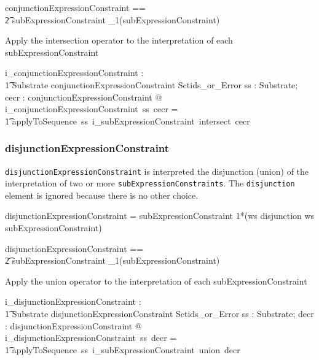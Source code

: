 \documentclass{article}
\def\spec#1{{\tt #1}}
\def\bnf#1{{\scriptsize {{#1}} }}
\begin{document}
\begin{zed}
conjunctionExpressionConstraint == \\
\t2 subExpressionConstraint \cross \seq_1(subExpressionConstraint)
\end{zed}

Apply the intersection operator to the interpretation of each  subExpressionConstraint

\begin{gendef}
    i\_conjunctionExpressionConstraint : \\
\t1 Substrate \fun conjunctionExpressionConstraint \fun Sctids\_or\_Error
\where
   \forall ss : Substrate;  cecr : conjunctionExpressionConstraint @ \\
i\_conjunctionExpressionConstraint~ss~cecr = \\
\t1 applyToSequence~ss~i\_subExpressionConstraint~intersect~cecr
\end{gendef}

\subsubsection{disjunctionExpressionConstraint}
\spec{disjunctionExpressionConstraint} is interpreted the disjunction (union) of the interpretation of two or more
\spec{subExpressionConstraints}. The \spec{disjunction} element is ignored because there is no other choice.
\begin{framed}
\noindent
\bnf{disjunctionExpressionConstraint = subExpressionConstraint 1*(ws disjunction ws subExpressionConstraint)}
\end{framed}

\begin{zed}
disjunctionExpressionConstraint == \\
\t2 subExpressionConstraint \cross \seq_1(subExpressionConstraint)
\end{zed}

Apply the union operator to the interpretation of each  subExpressionConstraint

\begin{gendef}
    i\_disjunctionExpressionConstraint : \\
\t1 Substrate \fun disjunctionExpressionConstraint \fun Sctids\_or\_Error
\where
   \forall ss : Substrate;  decr : disjunctionExpressionConstraint @ \\
i\_disjunctionExpressionConstraint~ss~decr = \\
\t1 applyToSequence~ss~i\_subExpressionConstraint~union~decr
\end{gendef}
\end{document}
